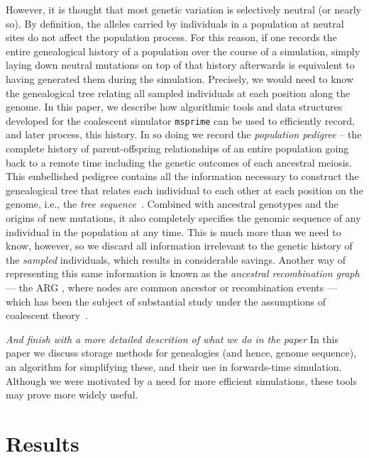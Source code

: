 \documentclass{article}
\newcommand{\msprime}{\texttt{msprime}}
\newcommand{\jk}[1]{{\em \color{red} #1}}
\begin{document}
However, it is thought that most genetic variation is selectively neutral (or nearly so).
By definition, the alleles carried by individuals in a population at neutral sites
do not affect the population process.
For this reason, if one records the entire genealogical history of a population over the course of a simulation,
simply laying down neutral mutations on top of that history afterwards
is equivalent to having generated them during the simulation.
Precisely, we would need to know the genealogical tree relating all sampled individuals
at each position along the genome.
In this paper, we describe how algorithmic tools and data structures developed for the
coalescent simulator \msprime{}
can be used to efficiently record, and later process, this history.
In so doing we record the \emph{population pedigree} --
the complete history of parent-offspring relationships of an entire population
going back to a remote time including the genetic outcomes of each ancestral
meiosis.
This embellished pedigree contains all the information necessary
to construct the genealogical tree that relates each individual to each other
at each position on the genome, i.e., the \emph{tree
sequence}~\citep{kelleher2016efficient}.
Combined with ancestral genotypes and the origins of new mutations,
it also completely specifies the genomic sequence of any individual in the population at any time.
This is much more than we need to know, however,
so we discard all information irrelevant to the genetic history
of the \emph{sampled} individuals,
which results in considerable savings.
Another way of representing this same information
is known as the \emph{ancestral recombination graph} ---
the {ARG} \citep{griffiths1997ancestral},
where nodes are common ancestor or recombination events ---
which has been the subject of substantial study
under the assumptions of coalescent
theory~\citep{wiuf1997number,wiuf1999ancestry,marjoram2006coalescent,wilton2015smc}.

\jk{And finish with a more detailed descrition of what we do in the paper}
In this paper we discuss storage methods for genealogies (and hence, genome sequence),
an algorithm for simplifying these,
and their use in forwards-time simulation.
Although we were motivated by a need for more efficient simulations,
these tools may prove more widely useful.


\section*{Results}
\end{document}
